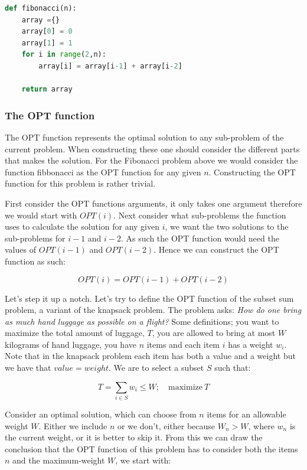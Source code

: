 \documentclass[12pt]{article} %
\begin{document}
\begin{lstlisting}[language=Python, caption=Dynamic programming Fibonacci numbers in Python]
def fibonacci(n):
    array ={}
    array[0] = 0
    array[1] = 1
    for i in range(2,n):
        array[i] = array[i-1] + array[i-2]

    return array
\end{lstlisting}

\subsubsection{The OPT function}
The OPT function represents the optimal solution to any sub-problem of the current problem. When constructing these one should consider the different parts that makes the solution. For the Fibonacci problem above we would consider the function fibbonacci as the OPT function for any given $n$. Constructing the OPT function for this problem is rather trivial. 

\par First consider the OPT functions arguments, it only takes one argument therefore we would start with $OPT(i)$. Next consider what sub-problems the function uses to calculate the solution for any given $i$, we want the two solutions to the sub-problems for $i - 1$ and $i - 2$. As such the OPT function would need the values of $OPT(i - 1)$ and $OPT(i - 2)$. Hence we can construct the OPT function as such:

\[ OPT(i) = OPT(i - 1) + OPT(i - 2) \]

\par Let's step it up a notch. Let's try to define the OPT function of the subset sum problem, a variant of the knapsack problem. The problem asks: \textit{How do one bring as much hand luggage as possible on a flight?} Some definitions; you want to maximize the total amount of luggage, $T$, you are allowed to bring at most $W$ kilograms of hand luggage, you have $n$ items and each item $i$ has a weight $w_{i}$. Note that in the knapsack problem each item has both a value and a weight but we have that $value = weight$. We are to select a subset $S$ such that:

\[ T = \sum_{i \in S} w_{i} \leq W; \quad \textrm{maximize}\ T \]

\par Consider an optimal solution, which can choose from $n$ items for an allowable weight $W$. Either we include $n$ or we don't, either because $W_{n} > W$, where $w_{n}$ is the current weight, or it is better to skip it. From this we can draw the conclusion that the OPT function of this problem has to consider both the items $n$ and the maximum-weight $W$, we start with:
\end{document}
